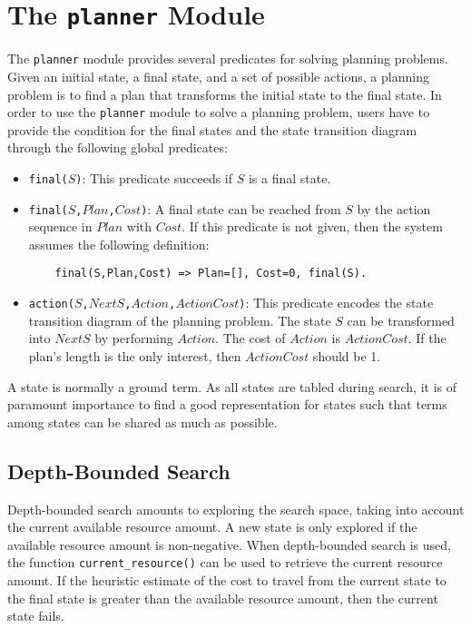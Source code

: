 \chapter{\label{chapter:planner}The \texttt{planner} Module}
The \texttt{planner} module provides several predicates for solving planning problems. Given an initial state, a final state, and a set of possible actions, a planning problem is to find a plan that transforms the initial state to the final state. In order to use the \texttt{planner} module to solve a planning problem, users have to provide the condition for the final states and the state transition diagram through the following global predicates:
\begin{itemize}
\item \texttt{final($S$)}: This predicate succeeds if $S$ is a final state.
\item \texttt{final($S$,$Plan$,$Cost$)}: A final state can be reached from $S$ by the action sequence in $Plan$ with $Cost$. If this predicate is not given, then the system assumes the following definition:
\begin{verbatim}
    final(S,Plan,Cost) => Plan=[], Cost=0, final(S).
\end{verbatim}

\item \texttt{action($S$,$NextS$,$Action$,$ActionCost$)}: This predicate encodes the state transition diagram of the planning problem. The state $S$ can be transformed into $NextS$ by performing $Action$. The cost of $Action$ is $ActionCost$. If the plan's length is the only interest, then $ActionCost$ should be 1.
\end{itemize}

A state is normally a ground term. As all states are tabled during search, it is of paramount importance to find a good representation for states such that terms among states can be shared as much as possible.

\section{Depth-Bounded Search}
Depth-bounded search amounts to exploring the search space, taking into account the current available resource amount. A new state is only explored if the available resource amount is non-negative. When depth-bounded search is used, the function {\tt current\_resource()} can be used to retrieve the current resource amount. If the heuristic estimate of the cost to travel from the current state to the final state is greater than the available resource amount, then the current state fails.

